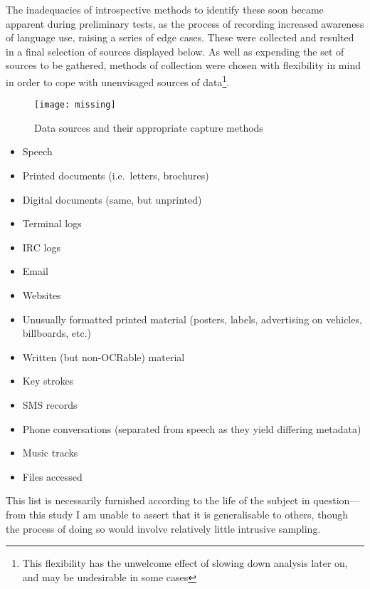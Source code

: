 The inadequacies of introspective methods to identify these soon became apparent during preliminary tests, as the process of recording increased awareness of language use, raising a series of edge cases.  These were collected and resulted in a final selection of sources displayed below.  As well as expending the set of sources to be gathered, methods of collection were chosen with flexibility in mind in order to cope with unenvisaged sources of data\footnote{This flexibility has the unwelcome effect of slowing down analysis later on, and may be undesirable in some cases}.


\begin{figure}[p]
\centering
\texttt{[image: missing]}
\caption{Data sources and their appropriate capture methods}
\label{fig:personal:datasources}
\end{figure}



\begin{itemize}
    \item Speech
    \item Printed documents (i.e.\ letters, brochures)
    \item Digital documents (same, but unprinted)
    \item Terminal logs
    \item IRC logs
    \item Email
    \item Websites
    \item Unusually formatted printed material (posters, labels, advertising on vehicles, billboards, etc.)
    \item Written (but non-OCRable) material
    \item Key strokes
    \item SMS records
    \item Phone conversations (separated from speech as they yield differing metadata)
    \item Music tracks
    \item Files accessed
\end{itemize}

This list is necessarily furnished according to the life of the subject in question---from this study I am unable to assert that it is generalisable to others, though the process of doing so would involve relatively little intrusive sampling.

